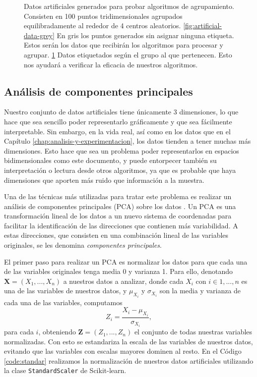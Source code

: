 \begin{figure}[h]
\begin{subfigure}{0.45\textwidth}
    \caption{}
    \label{fig:artificial-data-labeled}
  \end{subfigure}
  \caption[Datos artificiales para la prueba de algoritmos.]{Datos artificiales generados para probar algoritmos de agrupamiento. Consisten en 100 puntos tridimensionales agrupados equilibradamente al rededor de 4 centros aleatorios. \ref{fig:artificial-data-grey} En gris los puntos generados sin asignar ninguna etiqueta. Estos serán los datos que recibirán los algoritmos para procesar y agrupar. \ref{fig:artificial-data-labeled} Datos etiquetados según el grupo al que pertenecen. Esto nos ayudará a verificar la eficacia de nuestros algoritmos.}
  \label{fig:artificial-data}
\end{figure}

\subsection{Análisis de componentes principales}

Nuestro conjunto de datos artificiales tiene únicamente 3 dimensiones, lo que hace que sea sencillo poder representarlo gráficamente y que sea fácilmente interpretable. Sin embargo, en la vida real, así como en los datos que en el Capítulo \ref{chap:analisis-y-experimentacion}, los datos tienden a tener muchas más dimensiones. Esto hace que sea un problema poder representarlos en espacios bidimensionales como este documento, y puede entorpecer también su interpretación o lectura desde otros algoritmos, ya que es probable que haya dimensiones que aporten más ruido que información a la muestra.

Una de las técnicas más utilizadas para tratar este problema es realizar un análisis de componentes principales (PCA) sobre los datos \cite{pca}. Un PCA es una transformación lineal de los datos a un nuevo sistema de coordenadas para facilitar la identificación de las direcciones que contienen más variabilidad. A estas direcciones, que consisten en una combinación lineal de las variables originales, se les denomina \textit{componentes principales}.

El primer paso para realizar un PCA es normalizar los datos para que cada una de las variables originales tenga media 0 y varianza 1. Para ello, denotando $ \textbf{X} = (X_1, ..., X_n) $ a nuestros datos a analizar, donde cada $ X_i $ con $ i \in {1, ..., n} $ es una de las variables de nuestros datos, y $ \mu_{X_i} $ y $ \sigma_{X_i} $ son la media y varianza de cada una de las variables, computamos
\begin{equation}
  Z_i = \frac{X_i - \mu_{X_i}}{\sigma_{X_i}},
\end{equation}
para cada $ i $, obteniendo $ \textbf{Z} = (Z_1, ..., Z_n) $ el conjunto de todas nuestras variables normalizadas. Con esto se estandariza la escala de las variables de nuestros datos, evitando que las variables con escalas mayores dominen al resto. En el Código \ref{code:standar} realizamos la normalización de nuestros datos artificiales utilizando la clase \texttt{StandardScaler} de Scikit-learn.

